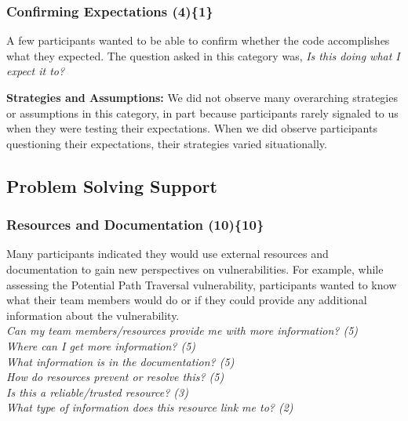 \documentclass[10pt,journal,compsoc]{IEEEtran}
\begin{document}




\subsubsection{Confirming Expectations (4)\{1\}}

\label{ce}

A few participants wanted to be able to confirm whether the code accomplishes what they expected. 
The question asked in this category was, \textit{Is this doing what I expect it to?} 



\textbf{Strategies and Assumptions:}
We did not observe many overarching strategies or assumptions in this category, in part because participants rarely signaled to us when they were testing their expectations. 
When we did observe participants questioning their expectations, their strategies varied situationally.


\subsection{Problem Solving Support}
\label{sec:results-pss}
\subsubsection{Resources and Documentation (10)\{10\}}

\label{rd}
Many participants indicated they would use external resources and documentation to gain new perspectives on vulnerabilities.
For example, while assessing the Potential Path Traversal vulnerability, participants wanted to know what their team members would do or if they could provide any additional information about the vulnerability. 
\\

\noindent\emph{Can my team members/resources provide me with more information? (5)} \\
\emph{Where can I get more information? (5)} \\
\emph{What information is in the documentation? (5)} \\
\emph{How do resources prevent or resolve this? (5)} \\
\emph{Is this a reliable/trusted resource? (3)} \\
\emph{What type of information does this resource link me to? (2)}
\\
 
\end{document}
